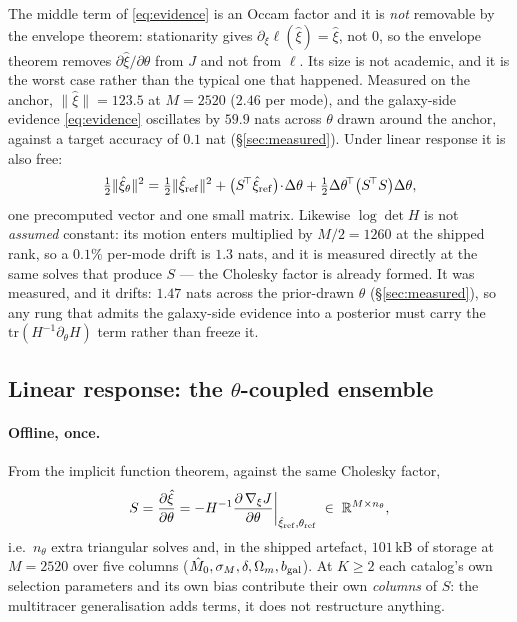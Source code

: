 \documentclass[11pt]{article}
\theoremstyle{definition}
\theoremstyle{remark}
\newcommand{\bgal}{b_{\rm gal}}
\newcommand{\tr}{\mathrm{tr}}
\begin{document}
\noindent The middle term of \eqref{eq:evidence} is an Occam factor and it is
\emph{not} removable by the envelope theorem: stationarity gives
$\partial_\xi\ell(\hat\xi)=\hat\xi$, not $0$, so the envelope theorem removes
$\partial\hat\xi/\partial\theta$ from $J$ and not from $\ell$. Its size is not
academic, and it is the worst case rather than the typical one that happened.
Measured on the anchor, $\|\hat\xi\|=123.5$ at $M=2520$ ($2.46$ per mode), and
the galaxy-side evidence \eqref{eq:evidence} oscillates by $59.9$ nats across
$\theta$ drawn around the anchor, against a target accuracy of $0.1$ nat
(\S\ref{sec:measured}). Under linear
response it is also free:
\begin{equation}
  \tfrac12\|\hat\xi_\theta\|^2
  =\tfrac12\|\hat\xi_{\rm ref}\|^2
  +\big(S^{\!\top}\hat\xi_{\rm ref}\big)\!\cdot\!\Delta\theta
  +\tfrac12\Delta\theta^{\!\top}\big(S^{\!\top}S\big)\Delta\theta ,
\end{equation}
one precomputed vector and one small matrix. Likewise $\log\det H$ is not
\emph{assumed} constant: its motion enters multiplied by $M/2=1260$ at the
shipped rank, so a $0.1\%$ per-mode drift is $1.3$ nats, and it is measured
directly at the same solves that produce $S$ --- the Cholesky factor is already
formed. It was measured, and it drifts: $1.47$ nats across the prior-drawn
$\theta$ (\S\ref{sec:measured}), so any rung that admits the galaxy-side evidence
into a posterior must carry the $\tr(H^{-1}\partial_\theta H)$ term rather than
freeze it.

\subsection{Linear response: the \texorpdfstring{$\theta$}{theta}-coupled ensemble}
\label{sec:linresp}

\paragraph{Offline, once.} From the implicit function theorem, against the same
Cholesky factor,
\begin{equation}
  S=\frac{\partial\hat\xi}{\partial\theta}
   =-H^{-1}\frac{\partial\,\nabla_\xi J}{\partial\theta}\bigg|_{\hat\xi_{\rm ref},\theta_{\rm ref}}
   \;\in\;\mathbb R^{M\times n_\theta},
  \label{eq:S}
\end{equation}
i.e.\ $n_\theta$ extra triangular solves and, in the shipped artefact,
$101$\,kB of storage at $M=2520$ over five columns
($\hat M_0,\sigma_M,\delta,\Omega_m,\bgal$). At $K\ge2$ each catalog's own selection parameters and its own bias
contribute their own \emph{columns} of $S$: the multitracer generalisation adds
terms, it does not restructure anything.
\end{document}
